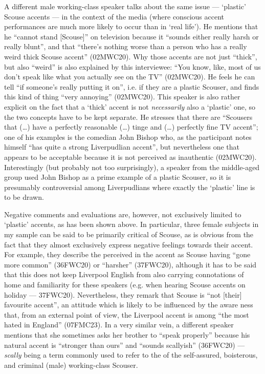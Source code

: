 A different male working-class speaker talks about the same issue --- `plastic' Scouse accents --- in the context of the media (where conscious accent performances are much more likely to occur than in `real life').
He mentions that he ``cannot stand [Scouse]'' on television because it ``sounds either really harsh or really blunt'', and that ``there's nothing worse than a person who has a really weird thick Scouse accent'' (02MWC20).
Why those accents are not just ``thick'', but also ``weird'' is also explained by this interviewee: ``You know, like, most of us don't speak like what you actually see on the TV'' (02MWC20).
He feels he can tell ``if someone's really putting it on'', i.e. if they are a plastic Scouser, and finds this kind of thing ``very annoying'' (02MWC20).
This speaker is also rather explicit on the fact that a `thick' accent is not \emph{necessarily} also a `plastic' one, so the two concepts have to be kept separate.
He stresses that there are ``Scousers that (\ldots) have a perfectly reasonable (\ldots) tinge and (\ldots) perfectly fine TV accent''; one of his examples is the comedian John Bishop who, as the participant notes himself ``has quite a strong Liverpudlian accent'', but nevertheless one that appears to be acceptable because it is not perceived as inauthentic (02MWC20).
Interestingly (but probably not too surprisingly), a speaker from the middle-aged group used John Bishop as a prime example of a plastic Scouser, so it is presumably controversial among Liverpudlians where exactly the `plastic' line is to be drawn.

Negative comments and evaluations are, however, not exclusively limited to `plastic' accents, as has been shown above.
In particular, three female subjects in my sample can be said to be primarily critical of Scouse, as is obvious from the fact that they almost exclusively express negative feelings towards their accent.
For example, they describe the perceived  in the accent as Scouse having ``gone more common'' (36FWC20) or ``harsher'' (37FWC20), although it has to be said that this does not keep Liverpool English from also carrying connotations of home and familiarity for these speakers (e.g. when hearing Scouse accents on holiday --- 37FWC20).
Nevertheless, they remark that Scouse is ``not [their] favourite accent'', an attitude which is likely to be influenced by the aware ness that, from an external point of view, the Liverpool accent is among ``the most hated in England'' (07FMC23).
In a very similar vein, a different speaker mentions that she sometimes asks her brother to ``speak properly'' because his natural accent is ``stronger than ours'' and ``sounds scallyish'' (36FWC20) --- \emph{scally} being a term commonly used to refer to the  of the self-assured, boisterous, and criminal (male) working-class Scouser.

